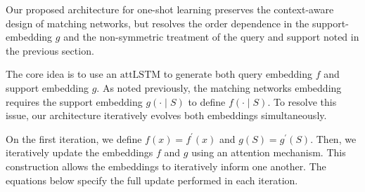 \documentclass[journal=jacsat,manuscript=article]{achemso}
\begin{document}
Our proposed architecture for one-shot learning preserves the context-aware design of matching networks, but resolves the order dependence in the support-embedding $g$ and the non-symmetric treatment of the query and support noted in the previous section.

The core idea is to use an $\text{attLSTM}$ to generate both query embedding $f$ and support embedding $g$. As noted previously, the matching networks \cite{vinyals2016matching} embedding requires the support embedding $g(\cdot \mid S)$ to define $f(\cdot \mid S)$. To resolve this issue, our architecture iteratively evolves both embeddings simultaneously.

On the first iteration, we define $f(x) = f^\prime(x)$ and $g(S)= g^\prime(S)$. Then, we iteratively update the embeddings $f$ and $g$ using an attention mechanism. This construction allows the embeddings to iteratively inform one another. The equations below specify the full update performed in each iteration.
\end{document}
